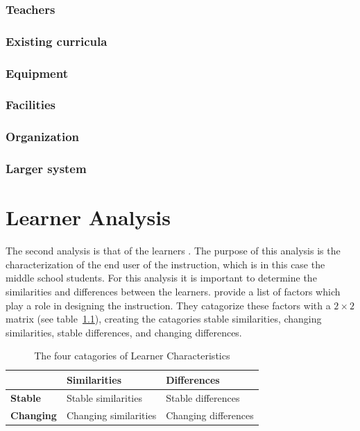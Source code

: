 \documentclass[12pt]{report} %
\begin{document}
\subsection{Teachers}

\subsection{Existing curricula}

\subsection{Equipment}

\subsection{Facilities}

\subsection{Organization}

\subsection{Larger system}


\chapter{Learner Analysis}

The second analysis is that of the learners \cite{smithragan}. The purpose of this analysis is the characterization of the end user of the instruction, which is in this case the middle school students. For this analysis it is important to determine the similarities and differences between the learners.  provide a list of factors which play a role in designing the instruction. They catagorize these factors with a ${2 \times 2}$ matrix (see table~\ref{tab:learneranalysis}), creating the catagories stable similarities, changing similarities, stable differences, and changing differences.

\begin{table}[h]
\begin{center}
\begin{tabular}{| l | l | l |}
\hline
 & \textbf{Similarities} & \textbf{Differences} \\ \hline
\textbf{Stable} & Stable similarities & Stable differences \\ \hline
\textbf{Changing} & Changing similarities & Changing differences \\ \hline
\end{tabular}
\end{center}
\caption{\footnotesize The four catagories of Learner Characteristics \protect \cite{smithragan} \label{tab:learneranalysis}}
\end{table}
\end{document}
